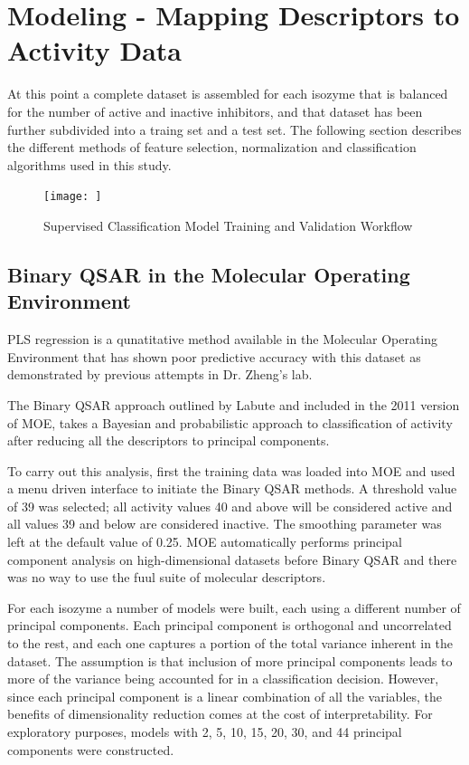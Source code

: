 \section{Modeling - Mapping Descriptors to Activity Data}

At this point a complete dataset is assembled for each isozyme that is balanced for the number of active and inactive inhibitors, and that dataset has been further subdivided into a traing set and a test set. The following section describes the different methods of feature selection, normalization and classification algorithms used in this study.

\begin{figure}[h,t]
  \caption{Supervised Classification Model Training and Validation Workflow}
  \centering
   \texttt{[image: ]}
\end{figure}

\subsection{Binary QSAR in the Molecular Operating Environment}
PLS regression is a qunatitative method available in the Molecular Operating Environment that has shown poor predictive accuracy with this dataset as demonstrated by previous attempts in Dr. Zheng's lab.

The Binary QSAR approach outlined by Labute \cite{Labute1999} and included in the 2011 version of MOE, takes a Bayesian and probabilistic approach to classification of activity after reducing all the descriptors to principal components.

To carry out this analysis, first the training data was loaded into MOE and used a menu driven interface to initiate the Binary QSAR methods. A threshold value of 39 was selected; all activity values 40 and above will be considered active and all values 39 and below are considered inactive. The smoothing parameter was left at the default value of 0.25. MOE automatically performs principal component analysis on high-dimensional datasets before Binary QSAR and there was no way to use the fuul suite of molecular descriptors.

For each isozyme a number of models were built, each using a different number of principal components.  Each principal component is orthogonal and uncorrelated to the rest, and each one captures a portion of the total variance inherent in the dataset. The assumption is that inclusion of more principal components leads to more of the variance being accounted for in a classification decision. However, since each principal component is a linear combination of all the variables, the benefits of dimensionality reduction comes at the cost of interpretability.  For exploratory purposes, models with 2, 5, 10, 15, 20, 30, and 44 principal components were constructed. 

